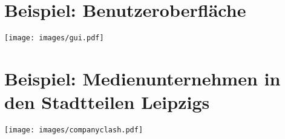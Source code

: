 \documentclass[a4paper, 
               12pt,
               DIV=calc,
               version=first,
               pdftex,
               headsepline,
               footsepline,
               bibliography=totocnumbered,
               listof=numbered]{scrreprt}
\begin{document}
\section{Beispiel: Benutzeroberfläche}
\label{sec:gui}
\centering
\texttt{[image: images/gui.pdf]}

\section{Beispiel: Medienunternehmen in den Stadtteilen Leipzigs}
\label{sec:companyclash}
\centering
\texttt{[image: images/companyclash.pdf]}


\listoftables
\listoffigures
\end{document}
